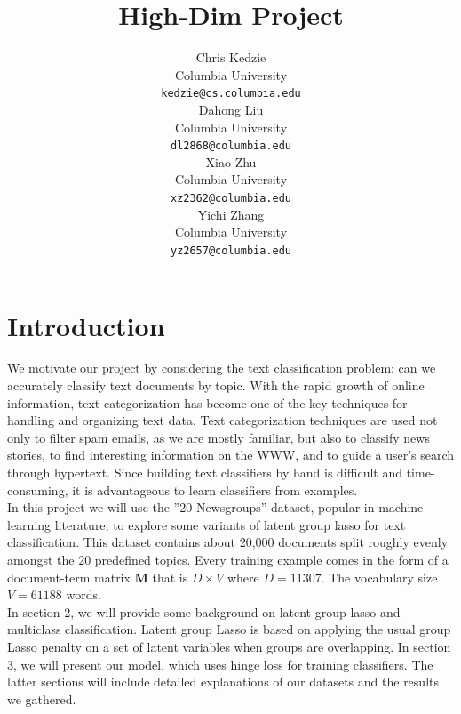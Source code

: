 \documentclass[11pt]{article}
\title{High-Dim Project}
\author{Chris Kedzie \\
  Columbia University\\
  {\small \tt kedzie@cs.columbia.edu} \\\And
  Dahong Liu \\
  Columbia University\\
  {\small \tt dl2868@columbia.edu} \\\And
  Xiao Zhu\\
  Columbia University\\
  {\small \tt xz2362@columbia.edu} \\\And
  Yichi Zhang\\
  Columbia University\\
  {\small \tt yz2657@columbia.edu} \\}
\date{}
\begin{document}
\maketitle

\section{Introduction}
We motivate our project by considering the text classification problem: 
can we accurately classify text documents by topic. With the rapid growth 
of online information, text categorization has become one of the key techniques 
for handling and organizing text data. Text categorization techniques are used 
not only to filter spam emails, as we are mostly familiar, but also to classify 
news stories, to find interesting information on the WWW, and to guide a 
user's search through hypertext. Since building text classifiers by hand is 
difficult and time-consuming, it is advantageous to learn classifiers from examples. \\

In this project we will use the ''20 Newsgroups'' dataset, popular in machine 
learning literature, to explore some variants of latent group lasso for text classification. 
This dataset contains about 20,000 documents split roughly evenly amongst the 20 
predefined topics. Every training example comes in the form of a document-term 
matrix $\mathbf{M}$ that is $D\times V$ where $D=11307$. The vocabulary 
size $V= 61188$ words. \\

In section 2, we will provide some background on latent group lasso and 
multiclass classification. Latent group Lasso is based on applying the usual 
group Lasso penalty on a set of latent variables when groups are overlapping.
In section 3, we will present our model, which uses hinge loss for training classifiers. 
The latter sections will include detailed explanations of our datasets and the 
results we gathered.
\end{document}
